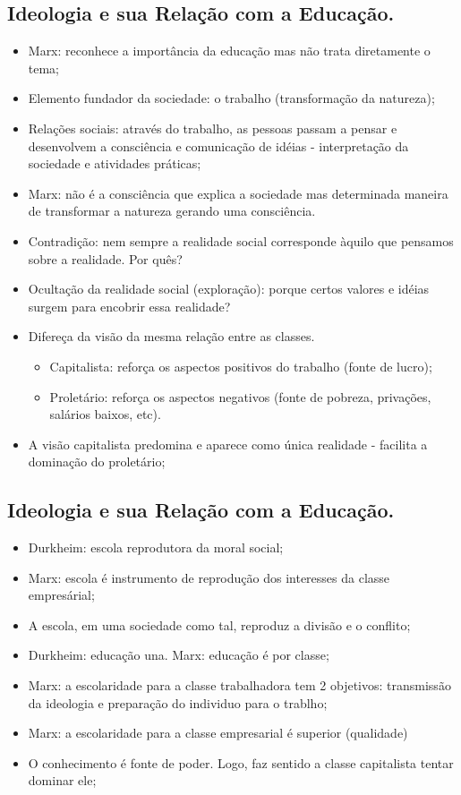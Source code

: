 \documentclass[a4paper,12pt]{article}
\begin{document}
\subsection{Ideologia e sua Relação com a Educação.}

\begin{itemize}
\item Marx: reconhece a importância da educação mas não trata diretamente o tema;
\item Elemento fundador da sociedade: o trabalho (transformação da natureza);
\item Relações sociais: através do trabalho, as pessoas passam a pensar e desenvolvem a consciência e comunicação de idéias - interpretação da sociedade e atividades práticas;
\item Marx: não é a consciência que explica a sociedade mas determinada maneira de transformar a natureza gerando uma consciência.
\item Contradição: nem sempre a realidade social corresponde àquilo que pensamos sobre a realidade. Por quês?
\item Ocultação da realidade social (exploração): porque certos valores e idéias surgem para encobrir essa realidade?
\item Difereça da visão da mesma relação entre as classes.
\begin{itemize}
\item Capitalista: reforça os aspectos positivos do trabalho (fonte de lucro);
\item Proletário: reforça os aspectos negativos (fonte de pobreza, privações, salários baixos, etc).
\end{itemize}
\item A visão capitalista predomina e aparece como única realidade - facilita a dominação do proletário;
\end{itemize}

\subsection{Ideologia e sua Relação com a Educação.}

\begin{itemize}
\item Durkheim: escola reprodutora da moral social;
\item Marx: escola é instrumento de reprodução dos interesses da classe empresárial;
\item A escola, em uma sociedade como tal, reproduz a divisão e o conflito;
\item Durkheim: educação una. Marx: educação é por classe;
\item Marx: a escolaridade para a classe trabalhadora tem 2 objetivos: transmissão da ideologia e preparação do individuo para o trablho;
\item Marx: a escolaridade para a classe empresarial é superior (qualidade)
\item O conhecimento é fonte de poder. Logo, faz sentido a classe capitalista tentar dominar ele;
\end{itemize}
\end{document}

